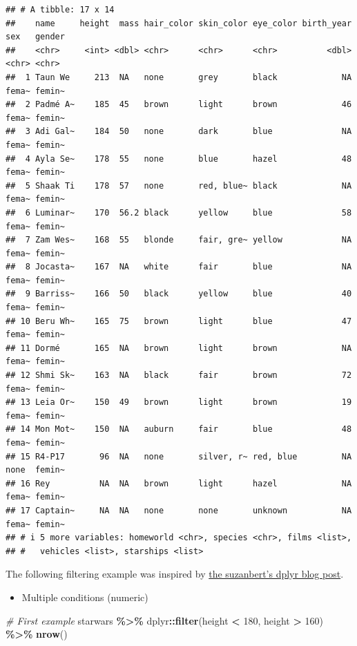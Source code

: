 \documentclass[
]{book}
\newenvironment{Shaded}{\begin{snugshade}}{\end{snugshade}}
\newcommand{\CommentTok}[1]{\textcolor[rgb]{0.56,0.35,0.01}{\textit{#1}}}
\newcommand{\DecValTok}[1]{\textcolor[rgb]{0.00,0.00,0.81}{#1}}
\newcommand{\FunctionTok}[1]{\textcolor[rgb]{0.13,0.29,0.53}{\textbf{#1}}}
\newcommand{\NormalTok}[1]{#1}
\newcommand{\SpecialCharTok}[1]{\textcolor[rgb]{0.81,0.36,0.00}{\textbf{#1}}}
\providecommand{\tightlist}{%
  \setlength{\itemsep}{0pt}\setlength{\parskip}{0pt}}
\begin{document}
\begin{verbatim}
## # A tibble: 17 x 14
##    name     height  mass hair_color skin_color eye_color birth_year sex   gender
##    <chr>     <int> <dbl> <chr>      <chr>      <chr>          <dbl> <chr> <chr> 
##  1 Taun We     213  NA   none       grey       black             NA fema~ femin~
##  2 Padmé A~    185  45   brown      light      brown             46 fema~ femin~
##  3 Adi Gal~    184  50   none       dark       blue              NA fema~ femin~
##  4 Ayla Se~    178  55   none       blue       hazel             48 fema~ femin~
##  5 Shaak Ti    178  57   none       red, blue~ black             NA fema~ femin~
##  6 Luminar~    170  56.2 black      yellow     blue              58 fema~ femin~
##  7 Zam Wes~    168  55   blonde     fair, gre~ yellow            NA fema~ femin~
##  8 Jocasta~    167  NA   white      fair       blue              NA fema~ femin~
##  9 Barriss~    166  50   black      yellow     blue              40 fema~ femin~
## 10 Beru Wh~    165  75   brown      light      blue              47 fema~ femin~
## 11 Dormé       165  NA   brown      light      brown             NA fema~ femin~
## 12 Shmi Sk~    163  NA   black      fair       brown             72 fema~ femin~
## 13 Leia Or~    150  49   brown      light      brown             19 fema~ femin~
## 14 Mon Mot~    150  NA   auburn     fair       blue              48 fema~ femin~
## 15 R4-P17       96  NA   none       silver, r~ red, blue         NA none  femin~
## 16 Rey          NA  NA   brown      light      hazel             NA fema~ femin~
## 17 Captain~     NA  NA   none       none       unknown           NA fema~ femin~
## # i 5 more variables: homeworld <chr>, species <chr>, films <list>,
## #   vehicles <list>, starships <list>
\end{verbatim}

The following filtering example was inspired by \href{https://suzan.rbind.io/2018/02/dplyr-tutorial-3/}{the suzanbert's dplyr blog post}.

\begin{itemize}
\tightlist
\item
  Multiple conditions (numeric)
\end{itemize}

\begin{Shaded}
\begin{Highlighting}[]
\CommentTok{\# First example}
\NormalTok{starwars }\SpecialCharTok{\%\textgreater{}\%}
\NormalTok{  dplyr}\SpecialCharTok{::}\FunctionTok{filter}\NormalTok{(height }\SpecialCharTok{\textless{}} \DecValTok{180}\NormalTok{, height }\SpecialCharTok{\textgreater{}} \DecValTok{160}\NormalTok{) }\SpecialCharTok{\%\textgreater{}\%}
  \FunctionTok{nrow}\NormalTok{()}
\end{Highlighting}
\end{Shaded}
\end{document}
